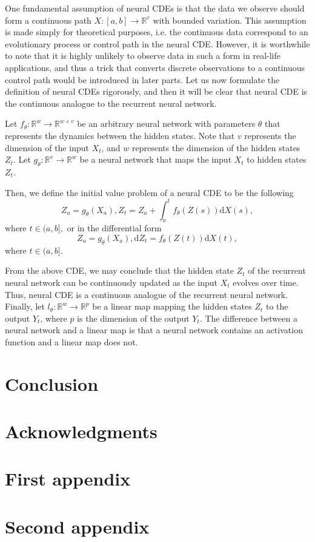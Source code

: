 \documentclass[a4paper,11pt,titlepage]{article}
\theoremstyle{definition}
\theoremstyle{plain}
\theoremstyle{remark}
\begin{document}
One fundamental assumption of neural CDEs is that the data we observe should form a continuous path $X:[a,b]\rightarrow\mathbb{R}^v$ with bounded variation. This assumption is made simply for theoretical purposes, i.e. the continuous data correspond to an evolutionary process or control path in the neural CDE. However, it is worthwhile to note that it is highly unlikely to observe data in such a form in real-life applications, and thus a trick that converts discrete observations to a continuous control path would be introduced in later parts. Let us now formulate the definition of neural CDEs rigorously, and then it will be clear that neural CDE is the continuous analogue to the recurrent neural network.

Let $f_\theta:\mathbb{R}^w\rightarrow\mathbb{R}^{w\times v}$ be an arbitrary neural network with parameters $\theta$ that represents the dynamics between the hidden states. Note that $v$ represents the dimension of the input $X_t$, and $w$ represents the dimension of the hidden states $Z_t$. Let $g_\theta:\mathbb{R}^v\rightarrow\mathbb{R}^w$ be a neural network that maps the input $X_t$ to hidden states $Z_t$.

Then, we define the initial value problem of a neural CDE to be the following
$$Z_a=g_\theta(X_a), Z_t=Z_a+\int_a^tf_\theta(Z(s))\mathrm{d}X(s),$$ where $t\in(a,b],$
or in the differential form
$$Z_a=g_\theta(X_a), \mathrm{d}Z_t=f_\theta(Z(t))\mathrm{d}X(t),$$ where $t\in(a,b].$

From the above CDE, we may conclude that the hidden state $Z_t$ of the recurrent neural network can be continuously updated as the input $X_t$ evolves over time. Thus, neural CDE is a continuous analogue of the recurrent neural network. Finally, let $l_\theta:\mathbb{R}^w\rightarrow\mathbb{R}^p$ be a linear map mapping the hidden states $Z_t$ to the output $Y_t$, where $p$ is the dimension of the output $Y_t$. The difference between a neural network and a linear map is that a neural network contains an activation function and a linear map does not.

\pagebreak
\section{Conclusion}

\section*{Acknowledgments}

\appendix

\pagebreak
\section{First appendix}

\pagebreak
\section{Second appendix}

\pagebreak

\end{document}
